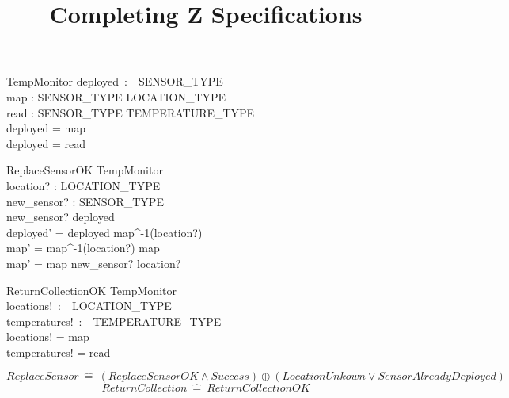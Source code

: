 \documentclass[12pt]{article}
\title{Completing Z Specifications}
\author{}
\newcommand{\dsubt}{\mathrel{%
		\ooalign{$\triangleleft$\cr\hidewidth\scalebox{.65}[1]{$-$}\hidewidth\cr}%
}}
\begin{document}
	\maketitle

	\begin{schema}{TempMonitor}
		deployed~:~~SENSOR\_TYPE\\
		map : SENSOR\_TYPE \nrightarrow LOCATION\_TYPE\\
		read : SENSOR\_TYPE  \nrightarrow TEMPERATURE\_TYPE\\
		\where
		deployed = \dom map\\
		deployed = \dom read
	\end{schema}
	
	\begin{schema}{ReplaceSensorOK}
		\Delta TempMonitor\\
		location? : LOCATION\_TYPE\\
		new\_sensor? : SENSOR\_TYPE\\
		\where
		new\_sensor? \notin deployed\\
		deployed' = deployed \setminus \left\lbrace map^{-1}(location?) \right\rbrace \\
		map' = \left\lbrace map^{-1}(location?) \right\rbrace \dsubt map \\
		map' = map \oplus \left\lbrace new\_sensor? \mapsto location? \right\rbrace \\
	\end{schema}
	
	\begin{schema}{ReturnCollectionOK}
		\Xi TempMonitor\\
		locations!~:~~LOCATION\_TYPE\\
		temperatures!~:~~TEMPERATURE\_TYPE\\
		\where
		locations! = \ran map\\
		temperatures! = \ran read\\
	\end{schema}

	\[ ReplaceSensor~\hat{=}~ (ReplaceSensorOK \wedge Success) \oplus (LocationUnkown \vee SensorAlreadyDeployed) \]
	\[ ReturnCollection~\hat{=}~ ReturnCollectionOK\]
\end{document}
